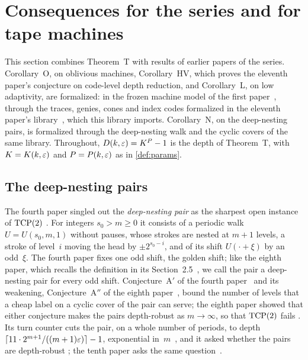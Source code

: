 \section{Consequences for the series and for tape machines}\label{sec:consequences}

This section combines Theorem~T with results of earlier papers of the series. Corollary~O, on oblivious machines,
Corollary~HV, which proves the eleventh paper's conjecture on code-level depth reduction, and Corollary~L, on low adaptivity, are
formalized: in the frozen machine
model of the first paper~\cite{FirstPaper2026}, through the traces, genies, cones and index
codes formalized in the eleventh paper's library~\cite{MergeDepth2026}, which this library imports. Corollary~N, on
the deep-nesting pairs, is formalized through the deep-nesting walk and the cyclic covers of the same library.
Throughout,
$D(k,\varepsilon)=K^P-1$ is the depth of Theorem~T, with $K=K(k,\varepsilon)$ and $P=P(k,\varepsilon)$ as in \cref{def:params}.

\subsection{The deep-nesting pairs}\label{sec:cons-dnp}

The fourth paper singled out the \emph{deep-nesting pair} as the sharpest open instance of $\mathrm{TCP}(2)$
\cite[Definitions~5.3 and~5.9]{FourthPaper2026}. For integers $s_0>m\ge0$ it consists of a periodic walk $U=U(s_0,m,1)$ without
pauses, whose strokes are nested at $m+1$ levels, a stroke of level~$i$ moving the head by $\pm2^{s_0-i}$, and of its shift
$U(\cdot+\xi)$ by an odd~$\xi$. The fourth paper fixes one odd shift, the golden shift; like the eighth paper, which recalls the
definition in its Section~2.5~\cite{EighthPaper2026}, we call the pair a deep-nesting pair for every odd shift. Conjecture~A$'$
of the fourth paper~\cite[Conjecture~5.25]{FourthPaper2026} and its weakening, Conjecture~A$''$ of the eighth
paper~\cite[Conjecture~5.24]{EighthPaper2026}, bound the number of levels that a cheap label on a cyclic cover of the pair can
serve; the eighth paper showed that either conjecture makes the pairs depth-robust as $m\to\infty$, so that $\mathrm{TCP}(2)$ fails
\cite[Corollary~5.26]{EighthPaper2026}. Its turn counter cuts the pair, on a whole number of periods, to depth
$\lceil11\cdot2^{m+1}/((m+1)\varepsilon)\rceil-1$, exponential in~$m$~\cite[Corollary~5.5]{EighthPaper2026}, and it asked whether the
pairs are depth-robust \cite[Problem~10.1(a)]{EighthPaper2026}; the tenth paper asks the same
question~\cite[Section~7]{DirectedReciprocity2026}.

